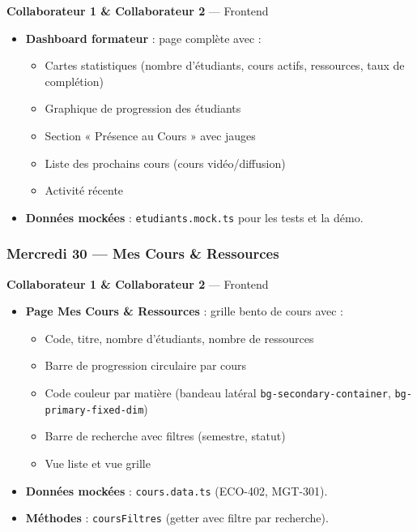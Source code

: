 \documentclass[a4paper,12pt,french]{article}
\begin{document}
\begin{assignmentbox}
\textbf{Collaborateur 1 \& Collaborateur 2} — Frontend
\end{assignmentbox}

\begin{itemize}
    \item \textbf{Dashboard formateur} : page complète avec :
    \begin{itemize}
        \item Cartes statistiques (nombre d'étudiants, cours actifs, ressources, taux de complétion)
        \item Graphique de progression des étudiants
        \item Section « Présence au Cours » avec jauges
        \item Liste des prochains cours (cours vidéo/diffusion)
        \item Activité récente
    \end{itemize}
    \item \textbf{Données mockées} : \texttt{etudiants.mock.ts} pour les tests et la démo.
\end{itemize}

\subsubsection{Mercredi 30 — Mes Cours \& Ressources}

\begin{assignmentbox}
\textbf{Collaborateur 1 \& Collaborateur 2} — Frontend
\end{assignmentbox}

\begin{itemize}
    \item \textbf{Page Mes Cours \& Ressources} : grille bento de cours avec :
    \begin{itemize}
        \item Code, titre, nombre d'étudiants, nombre de ressources
        \item Barre de progression circulaire par cours
        \item Code couleur par matière (bandeau latéral \texttt{bg-secondary-container}, \texttt{bg-primary-fixed-dim})
        \item Barre de recherche avec filtres (semestre, statut)
        \item Vue liste et vue grille
    \end{itemize}
    \item \textbf{Données mockées} : \texttt{cours.data.ts} (ECO-402, MGT-301).
    \item \textbf{Méthodes} : \texttt{coursFiltres} (getter avec filtre par recherche).
\end{itemize}
\end{document}
